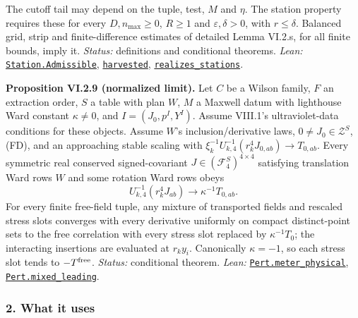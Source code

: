 \documentclass[
  letterpaper,
  11pt]{article}
\begin{document}
The cutoff tail may depend on the tuple, test, \(M\) and \(\eta\). The
station property requires these for every \(D,n_{\max}\ge0\), \(R\ge1\)
and \(\varepsilon,\delta>0\), with \(r\le\delta\). Balanced grid, strip
and finite-difference estimates of detailed Lemma VI.2.s, for all finite
bounds, imply it. \emph{Status:} definitions and conditional theorems.
\emph{Lean:}
\href{https://github.com/yang-mills-group/OpenAI-YM-20261028/blob/3456e5e75cf8d4cd558955a5c7638fba2d68f464/YM/Next/UV_STRESS/Station.lean\#L89-L97}{\texttt{Station.Admissible}},
\href{https://github.com/yang-mills-group/OpenAI-YM-20261028/blob/3456e5e75cf8d4cd558955a5c7638fba2d68f464/YM/Next/UV_STRESS/Station.lean\#L132-L180}{\texttt{harvested}},
\href{https://github.com/yang-mills-group/OpenAI-YM-20261028/blob/3456e5e75cf8d4cd558955a5c7638fba2d68f464/YM/Next/UV_STRESS/Granular.lean\#L134-L140}{\texttt{realizes\_stations}}.

\textbf{Proposition VI.2.9 (normalized limit).} Let \(C\) be a Wilson
family, \(F\) an extraction order, \(S\) a table with plan \(W\), \(M\)
a Maxwell datum with lighthouse Ward constant \(\kappa\ne0\), and
\(I=(J_0,p^I,Y^I)\). Assume VIII.1's ultraviolet-data conditions for
these objects. Assume \(W\)'s inclusion/derivative laws,
\(0\ne J_0\in\mathcal Z^S\), (FD), and an approaching stable scaling
with \(\xi_k^{-1}U_{k,4}^{-1}(r_k^4J_{0,ab})\to T_{0,ab}\). Every
symmetric real conserved signed-covariant
\(J\in(\mathcal F_4^S)^{4\times4}\) satisfying translation Ward rows
\(W\) and some rotation Ward rows obeys
\[U_{k,4}^{-1}(r_k^4J_{ab})\to\kappa^{-1}T_{0,ab}.\] For every finite
free-field tuple, any mixture of transported fields and rescaled stress
slots converges with every derivative uniformly on compact
distinct-point sets to the free correlation with every stress slot
replaced by \(\kappa^{-1}T_0\); the interacting insertions are evaluated
at \(r_ky_i\). Canonically \(\kappa=-1\), so each stress slot tends to
\(-T^{\rm free}\). \emph{Status:} conditional theorem. \emph{Lean:}
\href{https://github.com/yang-mills-group/OpenAI-YM-20261028/blob/3456e5e75cf8d4cd558955a5c7638fba2d68f464/YM/Pert/Weak.lean\#L118-L144}{\texttt{Pert.meter\_physical}},
\href{https://github.com/yang-mills-group/OpenAI-YM-20261028/blob/3456e5e75cf8d4cd558955a5c7638fba2d68f464/YM/Pert/Lifted.lean\#L85-L124}{\texttt{Pert.mixed\_leading}}.

\subsubsection{2. What it uses}\label{what-it-uses-24}
\end{document}
